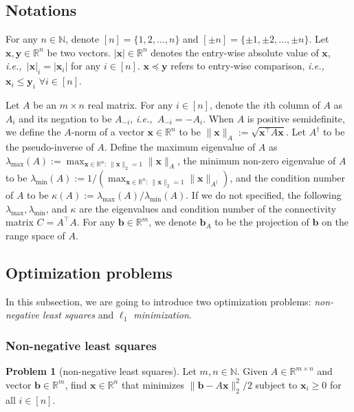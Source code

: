 \documentclass[11pt]{article}
\theoremstyle{remark}
\theoremstyle{definition}
\newtheorem{problem}{Problem}
\newcommand{\by}{\mathbf{y}}
\newcommand{\bx}{\mathbf{x}}
\newcommand{\bb}{\mathbf{b}}
\newcommand{\ATA}{A^\top A}
\newcommand{\ie} {{\it i.e.,\ }}
\newcommand{\R}{{\mathbb R}} %
\newcommand{\N}{{\mathbb{N}}} %
\begin{document}
\subsection{Notations}\label{sec:notations}
For any $n\in\N$, denote $[n]=\{1,2,\dots,n\}$ and $[\pm n]=\{\pm1,\pm2,\dots,\pm n\}$. Let $\bx,\by\in\R^n$ be two vectors. $|\bx|\in\R^n$ denotes the entry-wise absolute value of $\bx$, \ie $|\bx|_i=|\bx_i|$ for any $i\in[n]$. $\bx\preceq\by$ refers to entry-wise comparison, \ie $\bx_i\leq\by_i$ $\forall i\in[n]$. 

Let $A$ be an $m\times n$ real matrix. For any $i\in[n]$, denote the $i$th column of $A$ as $A_i$ and its negation to be $A_{-i}$, \ie $A_{-i}=-A_i$. When $A$ is positive semidefinite, we define the $A$-norm of a vector $\bx\in\R^n$ to be $\|\bx\|_A:=\sqrt{\bx^{\top}A\bx}$. Let $A^{\dagger}$ to be the pseudo-inverse of $A$. Define the maximum eigenvalue of $A$ as $\lambda_{\max}(A) := \max_{\bx\in\R^n:\ \|\bx\|_2=1}\|\bx\|_A$, the minimum non-zero eigenvalue of $A$ to be $\lambda_{\min}(A):=1/(\max_{\bx\in\R^n:\ \|\bx\|_2=1}\|\bx\|_{A^{\dagger}})$, and the condition number of $A$ to be $\kappa(A) := \lambda_{\max}(A)/\lambda_{\min}(A)$. If we do not specified, the following $\lambda_{\max},\lambda_{\min}$, and $\kappa$ are the eigenvalues and condition number of the connectivity matrix $C=\ATA$. For any $\bb\in\R^m$, we denote $\bb_A$ to be the projection of $\bb$ on the range space of $A$.

\subsection{Optimization problems}\label{sec:problems}
In this subsection, we are going to introduce two optimization problems: \textit{non-negative least squares} and \textit{$\ell_1$ minimization}.

\subsubsection{Non-negative least squares}
\begin{problem}[non-negative least squares]\label{prob:leastsquare}
	Let $m,n\in\N$. Given $A\in\R^{m\times n}$ and vector $\bb\in\R^m$, find $\bx\in\R^n$ that minimizes $\|\bb-A\bx\|_2^2/2$ subject to $\bx_i\geq0$ for all $i\in[n]$.
\end{problem}
\end{document}
